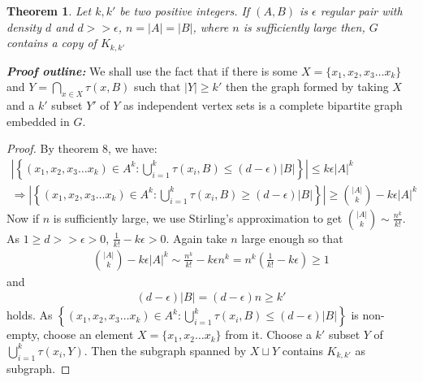 \documentclass{article}
\newtheorem{theorem}{Theorem}[]
\begin{document}
\begin{theorem}
	Let $k,k'$ be two positive integers. If $(A,B)$ is $\epsilon$ regular pair with density $d$ and $d>>\epsilon$, $n=|A|=|B|$, where $n$ is sufficiently large then, $G$ contains a copy of $K_{k,k'}$
\end{theorem}\noindent
\textbf{\textit{Proof outline: }}We shall use the fact that if there is some $X=\{x_1,x_2,x_3\hdots x_k\}$ and $Y=\bigcap_{x\in X}\tau(x,B)$ such that $|Y|\geq k'$ then  the graph formed by taking $X$ and a $k'$ subset $Y'$ of $Y$ as independent vertex sets is a complete bipartite graph embedded in $G$. 
\begin{proof}
	By theorem 8, we have:
	\begin{align}
		\left|\left\{(x_1,x_2,x_3\hdots x_k)\in A^k:\bigcup_{i=1}^k\tau(x_i,B)\leq (d-\epsilon)|B|\right\}\right|\leq  k\epsilon|A|^k\\
		\Rightarrow\left|\left\{(x_1,x_2,x_3\hdots x_k)\in A^k:\bigcup_{i=1}^k\tau(x_i,B)\geq (d-\epsilon)|B|\right\}\right|\geq {|A|\choose k}-k\epsilon|A|^k
	\end{align}
	Now if $n$ is sufficiently large, we use Stirling's approximation to  get ${|A|\choose k}\sim \frac{n^k}{k!}$. As $1\geq d>>\epsilon>0$, $\frac{1}{k!}-k\epsilon>0$. Again take $n$ large enough so that
	\begin{align}{|A|\choose k}-k\epsilon|A|^k\sim \frac{n^k}{k!}-k\epsilon n^k=n^k(\frac{1}{k!}-k\epsilon)\geq1\end{align}
	and 
	\begin{align}
		(d-\epsilon)|B|=(d-\epsilon)n\geq k'
	\end{align}
	holds. As $\left\{(x_1,x_2,x_3\hdots x_k)\in A^k:\bigcup_{i=1}^k\tau(x_i,B)\leq (d-\epsilon)|B|\right\}$ is non-empty, choose an element $X=\{x_1,x_2\hdots x_k\}$ from it. Choose a $k'$ subset $Y$ of  $\bigcup_{i=1}^k\tau(x_i,Y)$. Then the subgraph spanned by $X\sqcup Y$ contains $K_{k,k'}$ as subgraph.
\end{proof}
\end{document}
